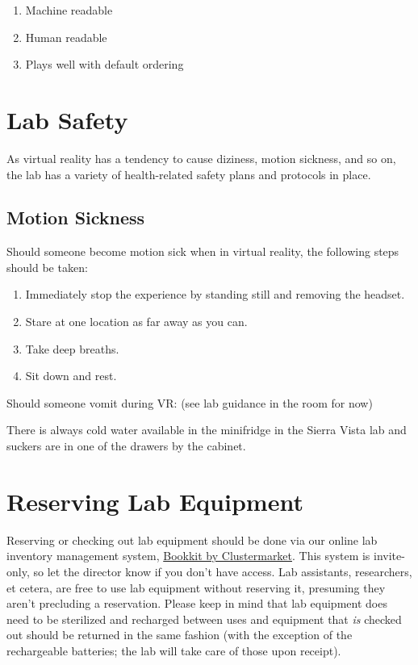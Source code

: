 \documentclass[]{tufte-book}
\providecommand{\tightlist}{%
  \setlength{\itemsep}{0pt}\setlength{\parskip}{0pt}}
\begin{document}
\begin{enumerate}
\def\labelenumi{\arabic{enumi}.}
\tightlist
\item
  Machine readable
\item
  Human readable
\item
  Plays well with default ordering
\end{enumerate}

\hypertarget{lab-safety}{%
\section{Lab Safety}\label{lab-safety}}

As virtual reality has a tendency to cause diziness, motion sickness, and so on, the lab has a variety of health-related safety plans and protocols in place.

\hypertarget{motion-sickness}{%
\subsection{Motion Sickness}\label{motion-sickness}}

Should someone become motion sick when in virtual reality, the following steps should be taken:

\begin{enumerate}
\def\labelenumi{\arabic{enumi}.}
\tightlist
\item
  Immediately stop the experience by standing still and removing the headset.
\item
  Stare at one location as far away as you can.
\item
  Take deep breaths.
\item
  Sit down and rest.
\end{enumerate}

Should someone vomit during VR: (see lab guidance in the room for now)

There is always cold water available in the minifridge in the Sierra Vista lab and suckers are in one of the drawers by the cabinet.

\hypertarget{reserving-lab-equipment}{%
\section{Reserving Lab Equipment}\label{reserving-lab-equipment}}

Reserving or checking out lab equipment should be done via our online lab inventory management system, \href{https://www.clustermarket.com}{Bookkit by Clustermarket}. This system is invite-only, so let the director know if you don't have access. Lab assistants, researchers, et cetera, are free to use lab equipment without reserving it, presuming they aren't precluding a reservation. Please keep in mind that lab equipment does need to be sterilized and recharged between uses and equipment that \emph{is} checked out should be returned in the same fashion (with the exception of the rechargeable batteries; the lab will take care of those upon receipt).
\end{document}
